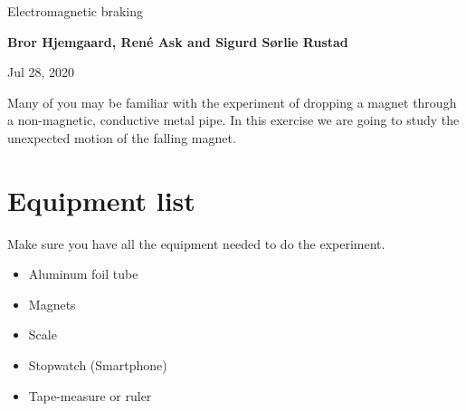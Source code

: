 \documentclass[%
oneside,                 %
final,                   %
10pt]{article}
\begin{document}

\newcommand{\exercisesection}[1]{\subsection*{#1}}






\thispagestyle{empty}

\begin{center}
{\LARGE\bf
\begin{spacing}{1.25}
Electromagnetic braking
\end{spacing}
}
\end{center}


\begin{center}
{\bf Bror Hjemgaard, René Ask and Sigurd Sørlie Rustad${}^{}$} \\ [0mm]
\end{center}

\begin{center}
\end{center}
    

\begin{center}
Jul 28, 2020
\end{center}

\vspace{1cm}


Many of you may be familiar with the experiment of dropping a magnet through a non-magnetic, conductive metal pipe. In this exercise we are going to study the unexpected motion of the falling magnet.

\section{Equipment list}
\label{title:equip_list}
Make sure you have all the equipment needed to do the experiment.
\begin{itemize}
  \item Aluminum foil tube

  \item Magnets

  \item Scale

  \item Stopwatch (Smartphone)

  \item Tape-measure or ruler
\end{itemize}
\end{document}
